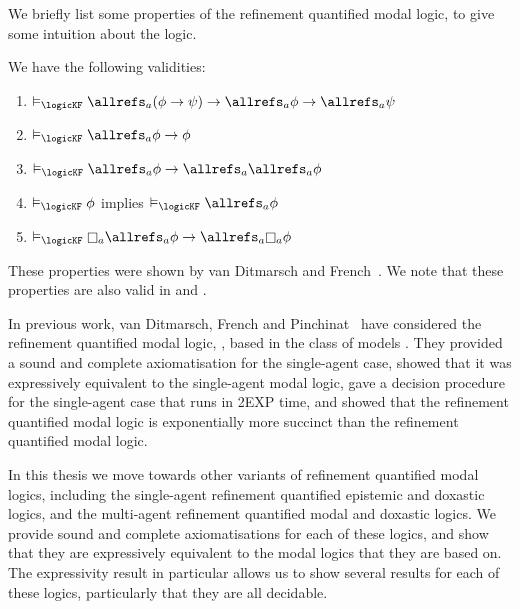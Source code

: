 We briefly list some properties of the refinement quantified modal logic, to
give some intuition about the logic. 
\pagebreak
\begin{proposition}
We have the following validities: 
\begin{enumerate}
\item $\entails_{\logicKF} \allrefs_a (\phi \implies \psi) \implies \allrefs_a
\phi \implies \allrefs_a \psi$
\item $\entails_{\logicKF} \allrefs_a \phi \implies \phi$
\item $\entails_{\logicKF} \allrefs_a \phi \implies \allrefs_a \allrefs_a \phi$
\item $\entails_{\logicKF} \phi$ implies $\entails_{\logicKF} \allrefs_a \phi$
\item $\entails_{\logicKF} \knows_a \allrefs_a \phi \implies \allrefs_a \knows_a
\phi$
\end{enumerate}
\end{proposition}

These properties were shown by van Ditmarsch and
French~\cite{french2009simulation}. We note that these properties are also valid
in \logicSF{} and \logicKDF{}.

In previous work, van Ditmarsch, French and Pinchinat~\cite{french2010future}
have considered the refinement quantified modal logic, \logicKF{}, based in the
class of models \classK{}. They provided a sound and complete axiomatisation for
the single-agent case, showed that it was expressively equivalent to the
single-agent modal logic, gave a decision procedure for the single-agent case
that runs in 2EXP time, and showed that the refinement quantified modal logic is
exponentially more succinct than the refinement quantified modal logic.

In this thesis we move towards other variants of refinement quantified modal
logics, including the single-agent refinement quantified epistemic and doxastic
logics, and the multi-agent refinement quantified modal and doxastic logics. We
provide sound and complete axiomatisations for each of these logics, and show
that they are expressively equivalent to the modal logics that they are based
on. The expressivity result in particular allows us to show several results for
each of these logics, particularly that they are all decidable.

